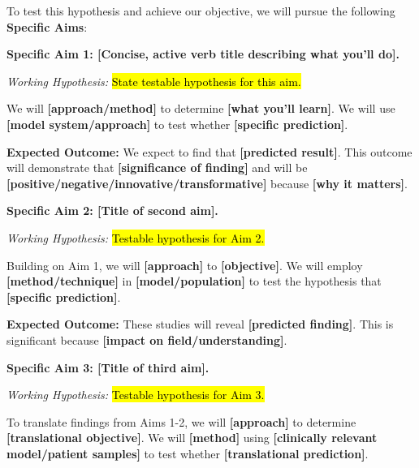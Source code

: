 \documentclass[11pt,letterpaper]{article}
\begin{document}

To test this hypothesis and achieve our objective, we will pursue the following \textbf{Specific Aims}:

\vspace{0.3cm}


\noindent\textbf{Specific Aim 1: [Concise, active verb title describing what you'll do].}

\textit{Working Hypothesis:} \hl{State testable hypothesis for this aim.}

We will \textbf{[approach/method]} to determine \textbf{[what you'll learn]}. We will use \textbf{[model system/approach]} to test whether \textbf{[specific prediction]}. 

\textbf{Expected Outcome:} We expect to find that \textbf{[predicted result]}. This outcome will demonstrate that \textbf{[significance of finding]} and will be \textbf{[positive/negative/innovative/transformative]} because \textbf{[why it matters]}.

\vspace{0.3cm}


\noindent\textbf{Specific Aim 2: [Title of second aim].}

\textit{Working Hypothesis:} \hl{Testable hypothesis for Aim 2.}

Building on Aim 1, we will \textbf{[approach]} to \textbf{[objective]}. We will employ \textbf{[method/technique]} in \textbf{[model/population]} to test the hypothesis that \textbf{[specific prediction]}.

\textbf{Expected Outcome:} These studies will reveal \textbf{[predicted finding]}. This is significant because \textbf{[impact on field/understanding]}.

\vspace{0.3cm}


\noindent\textbf{Specific Aim 3: [Title of third aim].}

\textit{Working Hypothesis:} \hl{Testable hypothesis for Aim 3.}

To translate findings from Aims 1-2, we will \textbf{[approach]} to determine \textbf{[translational objective]}. We will \textbf{[method]} using \textbf{[clinically relevant model/patient samples]} to test whether \textbf{[translational prediction]}.
\end{document}
